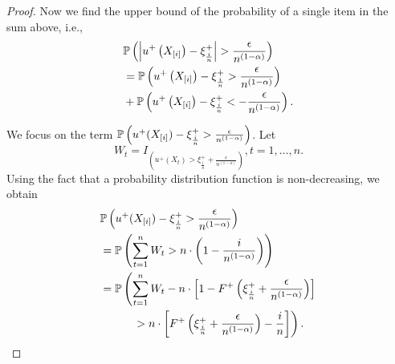 \begin{proof}
Now we find the upper bound of the probability of a single item in the sum above, i.e.,
\begin{align*}
& \mathbb{P}\left(  \left | u^+\left(X_{[i]}\right) - \xi^+_{\frac{i}{n}} \right | > \frac {\epsilon} {n^{\left(1-\alpha\right)}} \right) \\ 
& = \mathbb{P}\left( 
    u^+\left(X_{[i]}\right) - \xi^+_{\frac{i}{n}} > \frac {\epsilon} {n^{\left(1-\alpha\right)}} \right)\\
	&	+ \mathbb{P}\left(  u^+\left(X_{[i]}\right) -
    \xi^+_{\frac{i}{n}} < - \frac {\epsilon} {n^{\left(1-\alpha\right)}} \right).
\end{align*} 

We focus on the term 
$
\mathbb{P}\left( u^+(X_{[i]}) - \xi^+_{\frac{i}{n}} > \frac {\epsilon}{n^{(1-\alpha)}} \right)
$.
Let $$W_t = I_{\left(u^+(X_t) > \xi^+_{\frac{i}{n}} + \frac{\epsilon}{n^{(1-\alpha)}}\right)}, t=1, \ldots,n.$$ Using the fact that a probability distribution function is non-decreasing, we obtain 
\begin{align*}
& \mathbb{P}\left(  u^+(X_{[i]}) - \xi^+_{\frac{i}{n}} > \frac {\epsilon}{n^{(1-\alpha)}} \right)  \\
& = \mathbb{P}\left(  \sum _{t=1}^{n} W_t > n\cdot\left(1-\frac{i}{n^{(1-\alpha)}}\right) \right) \\ 
& = \mathbb{P} \left( \sum _{t=1}^{n} W_t - n \cdot \left[1-F^{+}\left(\xi^+_{\frac{i}{n}}
+\frac{\epsilon}{n^{(1-\alpha)}}\right)\right] \right. \\
&\left.\quad\qquad> n \cdot \left[F^{+}\left(\xi^+_{\frac{i}{n}} +\frac{\epsilon}{n^{(1-\alpha)}}\right)
- \frac{i}{n}\right]\right).
\end{align*}


\end{proof}
